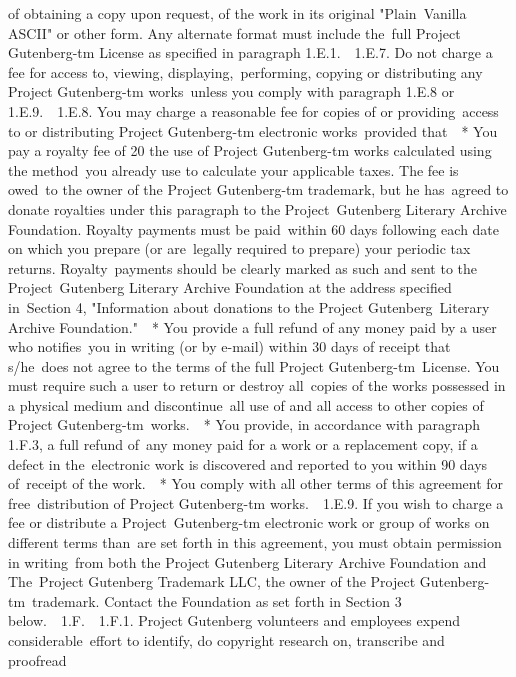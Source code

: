 {of obtaining a copy upon request, of the work in its original "Plain\
Vanilla ASCII" or other form. Any alternate format must include the\
full Project Gutenberg-tm License as specified in paragraph 1.E.1.\
\
1.E.7. Do not charge a fee for access to, viewing, displaying,\
performing, copying or distributing any Project Gutenberg-tm works\
unless you comply with paragraph 1.E.8 or 1.E.9.\
\
1.E.8. You may charge a reasonable fee for copies of or providing\
access to or distributing Project Gutenberg-tm electronic works\
provided that\
\
* You pay a royalty fee of 20%
  the use of Project Gutenberg-tm works calculated using the method\
  you already use to calculate your applicable taxes. The fee is owed\
  to the owner of the Project Gutenberg-tm trademark, but he has\
  agreed to donate royalties under this paragraph to the Project\
  Gutenberg Literary Archive Foundation. Royalty payments must be paid\
  within 60 days following each date on which you prepare (or are\
  legally required to prepare) your periodic tax returns. Royalty\
  payments should be clearly marked as such and sent to the Project\
  Gutenberg Literary Archive Foundation at the address specified in\
  Section 4, "Information about donations to the Project Gutenberg\
  Literary Archive Foundation."\
\
* You provide a full refund of any money paid by a user who notifies\
  you in writing (or by e-mail) within 30 days of receipt that s/he\
  does not agree to the terms of the full Project Gutenberg-tm\
  License. You must require such a user to return or destroy all\
  copies of the works possessed in a physical medium and discontinue\
  all use of and all access to other copies of Project Gutenberg-tm\
  works.\
\
* You provide, in accordance with paragraph 1.F.3, a full refund of\
  any money paid for a work or a replacement copy, if a defect in the\
  electronic work is discovered and reported to you within 90 days of\
  receipt of the work.\
\
* You comply with all other terms of this agreement for free\
  distribution of Project Gutenberg-tm works.\
\
1.E.9. If you wish to charge a fee or distribute a Project\
Gutenberg-tm electronic work or group of works on different terms than\
are set forth in this agreement, you must obtain permission in writing\
from both the Project Gutenberg Literary Archive Foundation and The\
Project Gutenberg Trademark LLC, the owner of the Project Gutenberg-tm\
trademark. Contact the Foundation as set forth in Section 3 below.\
\
1.F.\
\
1.F.1. Project Gutenberg volunteers and employees expend considerable\
effort to identify, do copyright research on, transcribe and proofread\
}
